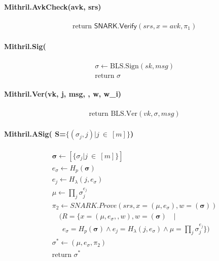 \documentclass{article}
\begin{document}
\paragraph{Mithril.AvkCheck(avk, srs)}

\begin{align*}
&\text{return } \mathsf{SNARK.Verify}(srs, x = avk,\pi_1)
\end{align*}

\paragraph{Mithril.Sig(}
\begin{align*}
&\sigma \leftarrow \mathrm{BLS.Sign}(sk, msg) \\
&\text{return } \sigma
\end{align*}

\paragraph{Mithril.Ver(vk, j, msg, \sigma, w, w_i)}
\begin{align*}
&\text{return } \mathrm{BLS.Ver}(vk,\sigma, msg) 
\end{align*}

\paragraph{Mithril.ASig( S=$\{(\sigma_j,j) | j\  \in\  [m]\}$)}
\begin{align*}
&\boldsymbol{\sigma} \leftarrow [\{\sigma_j | j\  \in\  [m]\}] \\
&e_{\sigma} \leftarrow H_p(\boldsymbol{\sigma}) \\
&e_j \leftarrow H_\lambda(j, e_{\sigma}) \\
&\mu \leftarrow \prod_j \sigma_j^{e_j} \\
&\pi_2 \leftarrow SNARK.Prove(srs,x=(\mu, e_{\sigma}),w=(\boldsymbol{\sigma})) \\
&\quad (R = \{x=(\mu, e_{\sigma},,w),w=(\boldsymbol{\sigma})\quad|\quad \\
&\quad \ \ e_{\sigma} = H_p(\boldsymbol{\sigma}) \land e_j = H_\lambda(j, e_{\sigma}) \land \mu = \prod_j \sigma_j^{e_j} \})\\ 
&\sigma^* \leftarrow (\mu, e_{\sigma},\pi_2) \\
&\text{return } \sigma^* 
\end{align*}
\end{document}
